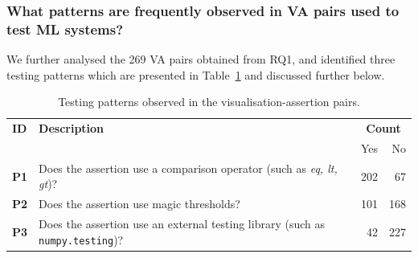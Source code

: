 \subsubsection{What patterns are frequently observed in VA pairs used to test ML systems?}

We further analysed the 269 VA pairs obtained from RQ1, and identified three testing patterns which are presented in Table~\ref{tab:testing-patterns} and discussed further below.

\begin{table}
  \centering
  \caption{Testing patterns observed in the visualisation-assertion pairs.}
  \begin{tabularx}{0.45\textwidth}{@{}l X r r@{}}
    \toprule
    \textbf{ID} &
    \textbf{Description} &
    \multicolumn{2}{c}{\textbf{Count}}\\
    & & Yes & No\\
    \midrule
    \textbf{P1} &
    Does the assertion use a comparison operator (such as \emph{eq, lt, gt})? &
    202 & 67\\
    \textbf{P2} &
    Does the assertion use magic thresholds? &
    101 & 168\\
    \textbf{P3} &
    Does the assertion use an external testing library (such as \texttt{numpy.testing})? &
    42 & 227\\
    \bottomrule
  \end{tabularx}
  \label{tab:testing-patterns}
\end{table}

